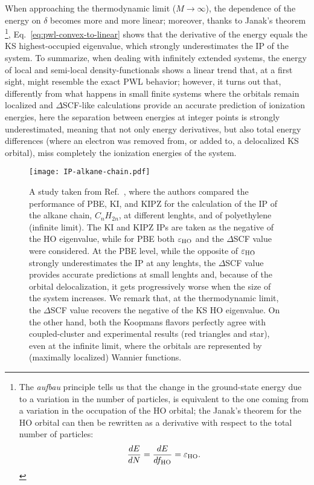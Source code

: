 %
When approaching the thermodynamic limit ($M\longrightarrow \infty$), the dependence of the energy on $\delta$ becomes more and more linear; moreover, thanks to Janak's theorem
\footnote{The \emph{aufbau} principle tells us that the change in the ground-state energy due to a variation in the number of particles, is equivalent to the one coming from a variation in the occupation of the HO orbital; the Janak's theorem for the HO orbital can then be rewritten as a derivative with respect to the total number of particles:
\begin{equation*}
    \frac{dE}{dN} = \frac{dE}{df_{\rm HO}} = \varepsilon_{\rm HO} .
\end{equation*}
}, 
Eq.~\eqref{eq:pwl-convex-to-linear} shows that the derivative of the energy equals the KS highest-occupied eigenvalue, which strongly underestimates the IP of the system. To summarize, when dealing with infinitely extended systems, the energy of local and semi-local density-functionals shows a linear trend that, at a first sight, might resemble the exact PWL behavior; however, it turns out that, differently from what happens in small finite systems where the orbitals remain localized and $\Delta$SCF-like calculations provide an accurate prediction of ionization energies, here the separation between energies at integer points is strongly underestimated, meaning that not only energy derivatives, but also total energy differences (where an electron was removed from, or added to, a delocalized KS orbital), miss completely the ionization energies of the system.

\begin{figure}
    \centering
    \texttt{[image: IP-alkane-chain.pdf]}
    \caption[PBE, KI, and KIPZ IPs for the alkane chain.]{A study taken from Ref.~\cite{nguyen_koopmans-compliant_2018}, where the authors compared the performance of PBE, KI, and KIPZ for the calculation of the IP of the alkane chain, $C_n H_{2n}$, at different lenghts, and of polyethylene (infinite limit). The KI and KIPZ IPs are taken as the negative of the HO eigenvalue, while for PBE both $\varepsilon_{\rm HO}$ and the $\Delta$SCF value were considered. At the PBE level, while the opposite of $\varepsilon_{\rm HO}$ strongly underestimates the IP at any lenghts, the $\Delta$SCF value provides accurate predictions at small lenghts and, because of the orbital delocalization, it gets progressively worse when the size of the system increases. We remark that, at the thermodynamic limit, the $\Delta$SCF value recovers the negative of the KS HO eigenvalue. On the other hand, both the Koopmans flavors perfectly agree with coupled-cluster and experimental results (red triangles and star), even at the infinite limit, where the orbitals are represented by (maximally localized) Wannier functions.}
    \label{fig:ip-alkane-chain}
\end{figure}

